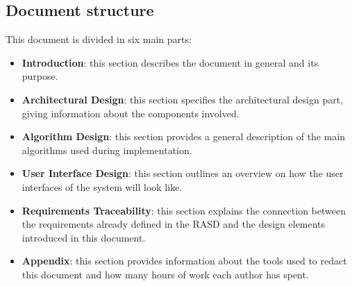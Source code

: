	\subsection{Document structure}
		This document is divided in six main parts:
		\begin{itemize}
			\item \textbf{Introduction}: this section describes the document in general and its purpose.
			\item \textbf{Architectural Design}: this section specifies the architectural design part, giving information about the components involved.
			\item \textbf{Algorithm Design}: this section provides a general description of the main algorithms used during implementation.
			\item\textbf{ User Interface Design}: this section outlines an overview on how the user interfaces of the system will look like. 
			\item \textbf{Requirements Traceability}: this section explains the connection between the requirements already defined in the RASD and the design elements introduced in this document.
			\item \textbf{Appendix}: this section provides information about the tools used to redact this document and how many hours of work each author has spent. 
		\end{itemize}


%